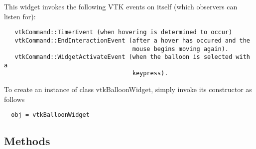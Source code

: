  This widget invokes the following VTK events on itself (which observers
 can listen for):
 \begin{verbatim}
   vtkCommand::TimerEvent (when hovering is determined to occur)
   vtkCommand::EndInteractionEvent (after a hover has occured and the
                                    mouse begins moving again).
   vtkCommand::WidgetActivateEvent (when the balloon is selected with a
                                    keypress).
 \end{verbatim}

To create an instance of class vtkBalloonWidget, simply
invoke its constructor as follows
\begin{verbatim}
  obj = vtkBalloonWidget
\end{verbatim}
\subsection{Methods}

